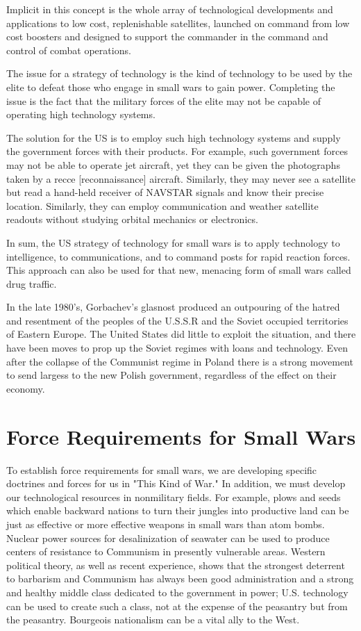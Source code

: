 Implicit in this concept is the whole array of technological developments and applications to low cost, replenishable satellites, launched on command from low cost boosters and designed to support the commander in the command and control of combat operations.

The issue for a strategy of technology is the kind of technology to be used by the elite to defeat those who engage in small wars to gain power. Completing the issue is the fact that the military forces of the elite may not be capable of operating high technology systems.

The solution for the US is to employ such high technology systems and supply the government forces with their products. For example, such government forces may not be able to operate jet aircraft, yet they can be given the photographs taken by a recce [reconnaissance] aircraft. Similarly, they may never see a satellite but read a hand-held receiver of NAVSTAR signals and know their precise location. Similarly, they can employ communication and weather satellite readouts without studying orbital mechanics or electronics.

In sum, the US strategy of technology for small wars is to apply technology to intelligence, to communications, and to command posts for rapid reaction forces. This approach can also be used for that new, menacing form of small wars called drug traffic.

In the late 1980's, Gorbachev's glasnost produced an outpouring of the hatred and resentment of the peoples of the U.S.S.R and the Soviet occupied territories of Eastern Europe. The United States did little to exploit the situation, and there have been moves to prop up the Soviet regimes with loans and technology. Even after the collapse of the Communist regime in Poland there is a strong movement to send largess to the new Polish government, regardless of the effect on their economy.

\section{Force Requirements for Small Wars}
To establish force requirements for small wars, we are developing specific doctrines and forces for us in "This Kind of War." In addition, we must develop our technological resources in nonmilitary fields. For example, plows and seeds which enable backward nations to turn their jungles into productive land can be just as effective or more effective weapons in small wars than atom bombs. Nuclear power sources for desalinization of seawater can be used to produce centers of resistance to Communism in presently vulnerable areas. Western political theory, as well as recent experience, shows that the strongest deterrent to barbarism and Communism has always been good administration and a strong and healthy middle class dedicated to the government in power; U.S. technology can be used to create such a class, not at the expense of the peasantry but from the peasantry. Bourgeois nationalism can be a vital ally to the West.

